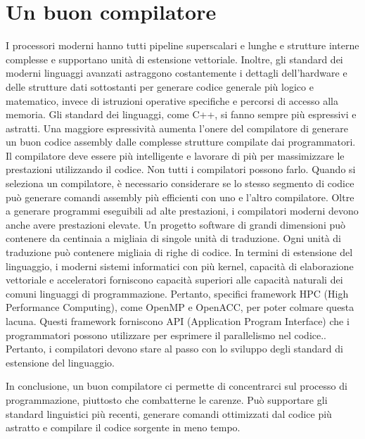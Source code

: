 \documentclass[12pt,a4paper]{report}
\begin{document}
\section{Un buon compilatore}
I processori moderni hanno tutti pipeline superscalari e lunghe e strutture interne complesse e supportano unità di estensione vettoriale. Inoltre, gli standard dei moderni linguaggi avanzati astraggono costantemente i dettagli dell'hardware e delle strutture dati sottostanti per generare codice generale più logico e matematico, invece di istruzioni operative specifiche e percorsi di accesso alla memoria. Gli standard dei linguaggi, come C++, si fanno  sempre più espressivi e astratti. Una maggiore espressività aumenta l'onere del compilatore di generare un buon codice assembly dalle complesse strutture compilate dai programmatori. Il compilatore deve essere più intelligente e lavorare di più per massimizzare le prestazioni utilizzando il codice. Non tutti i compilatori possono farlo. Quando si seleziona un compilatore,  è necessario considerare se lo stesso segmento di codice può generare comandi assembly più efficienti con uno e l'altro compilatore.
Oltre a generare programmi eseguibili ad alte prestazioni, i compilatori moderni devono anche avere prestazioni elevate. Un progetto software di grandi dimensioni  può contenere da centinaia a migliaia di singole unità di traduzione. Ogni unità di traduzione può contenere migliaia di righe di codice. 
In termini di estensione del linguaggio, i moderni sistemi informatici con più kernel, capacità di elaborazione vettoriale e acceleratori forniscono capacità superiori alle capacità naturali dei comuni linguaggi di programmazione. Pertanto, specifici framework HPC (High Performance Computing), come OpenMP e OpenACC, per poter colmare questa lacuna. Questi framework forniscono API (Application Program Interface) che i programmatori possono utilizzare per esprimere il parallelismo nel codice.. Pertanto, i compilatori devono stare al passo con lo sviluppo degli standard di estensione del linguaggio.

In conclusione, un buon compilatore ci permette di concentrarci sul processo di programmazione, piuttosto che combatterne le carenze. Può supportare gli standard linguistici più recenti, generare comandi ottimizzati dal codice più astratto e compilare il codice sorgente in meno tempo.
\end{document}
